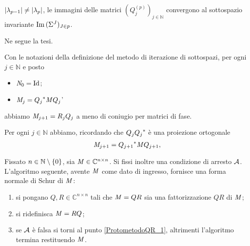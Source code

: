 $\left \lvert \lambda_{p - 1} \right \rvert \neq \left \lvert \lambda_p \right \rvert$,
le immagini delle matrici
$(Q^{(p)}_j)_{j \in \mathbb{N}}$
convergono al sottospazio invariante
$\operatorname{Im}{(\Sigma^J)_{J \in p}}$.
\par Ne segue la tesi. \EndProof
\begin{Lemma}
  Con le notazioni della definizione del metodo di iterazione di sottospazi,
  per ogni $j \in \mathbb{N}$ e posto
  \begin{itemize}
    \item $\VarMatrix_0 = \Identity$;
    \item $\mathit{M}_j = {Q_j}^* \mathit{M} Q_j$'
  \end{itemize}
  abbiamo
  $\mathit{M}_{j + 1} = R_j Q_j$
  a meno di coniugio per matrici di fase.
\end{Lemma}
\Proof Per ogni $j \in \mathbb{N}$ abbiamo, ricordando che
$Q_j {Q_j}^*$ \`e una proiezione ortogonale
\begin{align*}
  \mathit{M}_{j + 1}
  &= {Q_{j + 1}}^* \mathit{M} Q_{j + 1},\\
\end{align*}
\begin{Theorem}
  Fissato $n \in \mathbb{N} \setminus \lbrace 0 \rbrace$, sia
  $\mathit{M} \in \mathbb{C}^{n \times n}$.
  Si fissi inoltre una condizione di arresto $\mathcal{A}$.
  L'algoritmo seguente, avente $\mathit{M}$
  come dato di ingresso, fornisce una forma normale di Schur di $\mathit{M}$:
  \begin{enumerate}
    \item\label{ProtometodoQR_1} si pongano $Q, R \in \mathbb{C}^{n \times n}$
      tali che $\mathit{M} = QR$ sia una fattorizzazione $QR$ di $\mathit{M}$;
    \item\label{ProtometodoQR_2} si ridefinisca
      $\mathit{M} = RQ$;
    \item\label{ProtometodoQR_3} se
      $\mathcal{A}$ \`e falsa
      si torni al punto
      \ref{ProtometodoQR_1}, altrimenti l'algoritmo termina
      restituendo $\mathit{M}$.
  \end{enumerate}
\end{Theorem}
\begin{listing}
	\caption{Implementazione del metodo di iterazioni di sottospazi 
    per il calcolo di una forma normale di Schur in .}
\end{listing}
\Proof 
